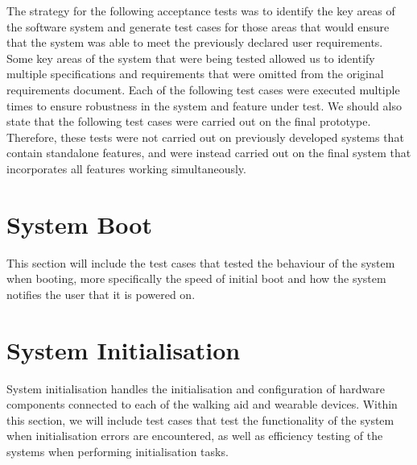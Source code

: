     The strategy for the following acceptance tests was to identify the key areas of the software system and generate test cases for those areas that would ensure that the system was able to meet the previously declared user requirements. Some key areas of the system that were being tested allowed us to identify multiple specifications and requirements that were omitted from the original requirements document. Each of the following test cases were executed multiple times to ensure robustness in the system and feature under test. We should also state that the following test cases were carried out on the final prototype. Therefore, these tests were not carried out on previously developed systems that contain standalone features, and were instead carried out on the final system that incorporates all features working simultaneously.


    \section{System Boot}
    \label{sec:test_boot}

        This section will include the test cases that tested the behaviour of the system when booting, more specifically the speed of initial boot and how the system notifies the user that it is powered on.

        \vspace{1em}
        

        \vspace{4em}
        

        \vspace{4em}
        

        \vspace{4em}
        

    \section{System Initialisation}
    \label{sec:test_init}

        System initialisation handles the initialisation and configuration of hardware components connected to each of the walking aid and wearable devices. Within this section, we will include test cases that test the functionality of the system when initialisation errors are encountered, as well as efficiency testing of the systems when performing initialisation tasks.

